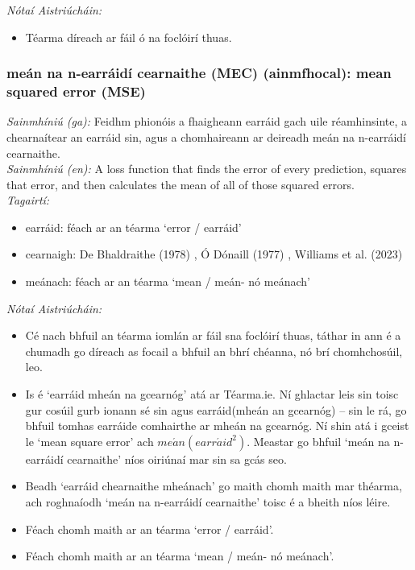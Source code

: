  \noindent \textit{Nótaí Aistriúcháin:}
\begin{itemize}
	\item Téarma díreach ar fáil ó na foclóirí thuas.
\end{itemize}


\subsubsection*{meán na n-earráidí cearnaithe (MEC) (ainmfhocal): mean squared error (MSE)}
 \noindent \textit{Sainmhíniú (ga):} Feidhm phionóis a fhaigheann earráid gach uile réamhinsinte, a chearnaítear an earráid sin, agus a chomhaireann ar deireadh meán na n-earráidí cearnaithe.
\\
 \noindent \textit{Sainmhíniú (en):} A loss function that finds the error of every prediction, squares that error, and then calculates the mean of all of those squared errors.
\\
 \noindent \textit{Tagairtí:}
\begin{itemize}
	\item earráid: féach ar an téarma `error / earráid'
	\item cearnaigh: De Bhaldraithe (1978) \cite{de-bhaldraithe}, Ó Dónaill (1977) \cite{odonaill}, Williams et al. (2023) \cite{storchiste}
	\item meánach: féach ar an téarma `mean / meán- nó meánach'
\end{itemize}

 \noindent \textit{Nótaí Aistriúcháin:}
\begin{itemize}
	\item Cé nach bhfuil an téarma iomlán ar fáil sna foclóirí thuas, táthar in ann é a chumadh go díreach as focail a bhfuil an bhrí chéanna, nó brí chomhchosúil, leo.
	\item Is é `earráid mheán na gcearnóg' atá ar Téarma.ie. Ní ghlactar leis sin toisc gur cosúil gurb ionann sé sin agus earráid(mheán an gcearnóg) -- sin le rá, go bhfuil tomhas earráide comhairthe ar mheán na gcearnóg. Ní shin atá i gceist le `mean square error' ach $me\acute{a}n(earr\acute{a}id^2)$. Meastar go bhfuil `meán na n-earráidí cearnaithe' níos oiriúnaí mar sin sa gcás seo.
	\item Beadh `earráid chearnaithe mheánach' go maith chomh maith mar théarma, ach roghnaíodh `meán na n-earráidí cearnaithe' toisc é a bheith níos léire.
	\item Féach chomh maith ar an téarma `error / earráid'.
	\item Féach chomh maith ar an téarma `mean / meán- nó meánach'.
\end{itemize}


